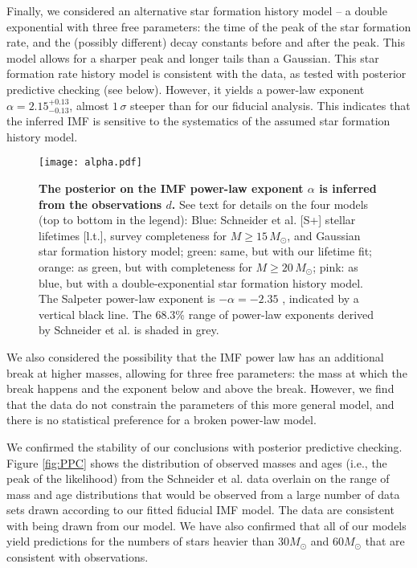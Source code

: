 \documentclass[12pt]{article}
\newcommand{\MSun}{M_\odot}
\newcommand{\onesigrange}[3]{\ensuremath{#1^{+#2}_{-#3}}}
\newcommand{\alpharangefour}{\onesigrange{2.15}{0.13}{0.13}}
\begin{document}
Finally, we considered an alternative star formation history model -- a double exponential with three free parameters: the time of the peak of the star formation rate, and the (possibly different) decay constants before and after the peak.  This model allows for a sharper peak and longer tails than a Gaussian.  This star formation rate history model is consistent with the data, as tested with posterior predictive checking (see below).  However, it yields a power-law exponent $\alpha=\alpharangefour$, almost  $1\, \sigma$ steeper than for our fiducial analysis.  This indicates that the inferred IMF is sensitive to the systematics of the assumed star formation history model.

\begin{figure}
\texttt{[image: alpha.pdf]}
    		\caption{{\bf The posterior on the IMF power-law exponent $\alpha$ is inferred from the observations $d$.}  See text for details on the four models (top to bottom in the legend): Blue: Schneider et al.\cite{Schneider:2018} [S+] stellar lifetimes [l.t.], survey completeness for $M \geq 15 \, \MSun$, and Gaussian star formation history model; green: same, but with our lifetime fit; orange: as green, but with completeness for $M \geq 20 \, \MSun$; pink: as blue, but with a double-exponential star formation history model.  The Salpeter power-law exponent is $-\alpha=-2.35$ \cite{Salpeter:1955}, indicated by a vertical black line.  The 68.3\% range of power-law exponents derived by Schneider et al.\cite{Schneider:2018} is shaded in grey.}\label{fig:IMF}
\end{figure}

We also considered the possibility that the IMF power law has an additional break at higher masses, allowing for three free parameters: the mass at which the break happens and the exponent below and above the break.  However, we find that the data do not constrain the parameters of this more general model, and there is no statistical preference for a broken power-law model.

We confirmed the stability of our conclusions with posterior predictive checking.
Figure \ref{fig:PPC} shows the distribution of observed masses and ages (i.e.,
the peak of the likelihood) from the Schneider et al.\cite{Schneider:2018} data overlain on the
range of mass and age distributions that would be observed from a large number
of data sets drawn according to our fitted fiducial IMF model.  The data are consistent with being drawn from our model.  We have also confirmed that all of our models yield predictions for the numbers of stars heavier than $30 M_\odot$ and $60 M_\odot$ that are consistent with observations.
\end{document}
